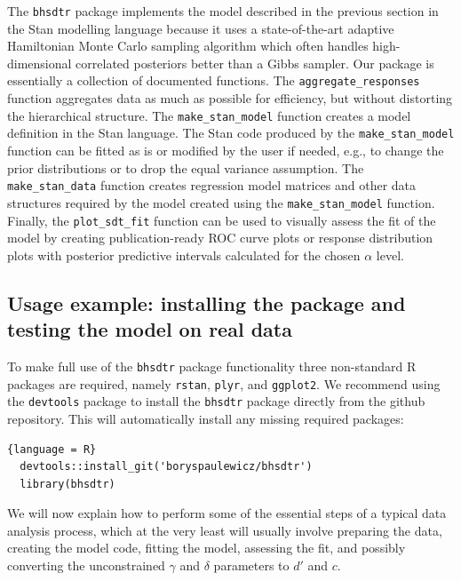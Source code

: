 \documentclass[oneside,a4paper]{article}
\begin{document}
The \texttt{bhsdtr} package implements the model described in the
previous section in the Stan modelling language
\cite{carpenter2016stan} because it uses a state-of-the-art adaptive
Hamiltonian Monte Carlo sampling algorithm which often handles
high-dimensional correlated posteriors better than a Gibbs
sampler. Our package is essentially a collection of documented
functions. The \texttt{aggregate\_responses} function aggregates data
as much as possible for efficiency, but without distorting the
hierarchical structure. The \texttt{make\_stan\_model} function
creates a model definition in the Stan language. The Stan code
produced by the \texttt{make\_stan\_model} function can be fitted as
is or modified by
the user if needed, e.g., to change the prior distributions or to drop
the equal variance assumption. The \texttt{make\_stan\_data} function
creates regression model matrices and other data structures required
by the model created using the \texttt{make\_stan\_model}
function. Finally, the \texttt{plot\_sdt\_fit} function can be used to
visually assess the fit of the model by creating publication-ready ROC
curve plots or response distribution plots with posterior predictive
intervals calculated for the chosen $\alpha$ level.

\subsection{Usage example: installing the package and testing the
  model on real data}

To make full use of the \texttt{bhsdtr} package functionality three
non-standard R packages are required, namely
\texttt{rstan}, %
\texttt{plyr}, and \texttt{ggplot2}. We recommend using the
\texttt{devtools} package to install the \texttt{bhsdtr} package
directly from the github repository. This will automatically install
any missing required packages:

\begin{lstlisting}{language = R}
  devtools::install_git('boryspaulewicz/bhsdtr')
  library(bhsdtr)
\end{lstlisting}

We will now explain how to perform some of the essential steps of a
typical data analysis process, which at the very least will usually
involve preparing the data, creating the model code, fitting the
model, assessing the fit, and possibly converting the unconstrained
$\gamma$ and $\delta$ parameters to $d'$ and $c$.
\end{document}
